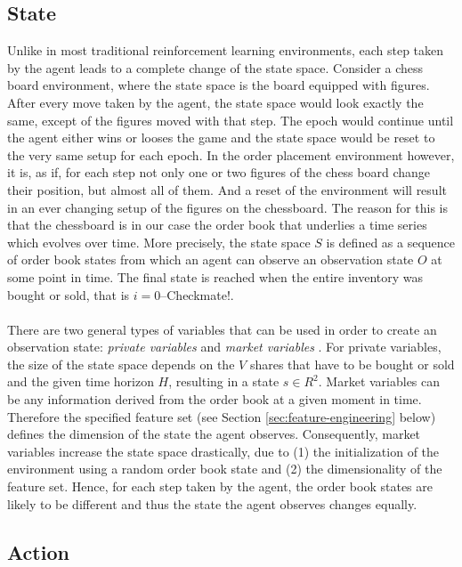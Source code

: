 \subsection{State}
\label{setup:state}
Unlike in most traditional reinforcement learning environments, each step taken by the agent leads to a complete change of the state space.
Consider a chess board environment, where the state space is the board equipped with figures. 
After every move taken by the agent, the state space would look exactly the same, except of the figures moved with that step.
The epoch would continue until the agent either wins or looses the game and the state space would be reset to the very same setup for each epoch.
In the order placement environment however, it is, as if, for each step not only one or two figures of the chess board change their position, but almost all of them.
And a reset of the environment will result in an ever changing setup of the figures on the chessboard.
The reason for this is that the chessboard is in our case the order book that underlies a time series which evolves over time.
More precisely, the state space $S$ is defined as a sequence of order book states from which an agent can observe an observation state $O$ at some point in time.
The final state is reached when the entire inventory was bought or sold, that is $i=0$--Checkmate!.
\\
\\
There are two general types of variables that can be used in order to create an observation state: \textit{private variables} and \textit{market variables} \cite{nevmyvaka2006reinforcement}.
For private variables, the size of the state space depends on the $V$ shares that have to be bought or sold and the given time horizon $H$, resulting in a state $s \in R^2$.
Market variables can be any information derived from the order book at a given moment in time.
Therefore the specified feature set (see Section \ref{sec:feature-engineering} below) defines the dimension of the state the agent observes.
Consequently, market variables increase the state space drastically, due to (1) the initialization of the environment using a random order book state and (2) the dimensionality of the feature set.
Hence, for each step taken by the agent, the order book states are likely to be different and thus the state the agent observes changes equally. 

\subsection{Action}

